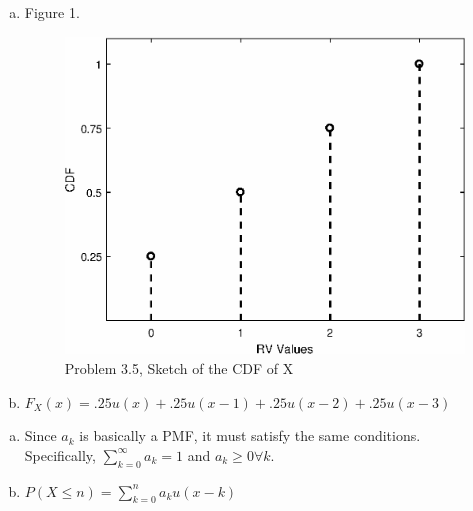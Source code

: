 \documentclass[12pt]{article}
\newenvironment{problem}[2][Problem]{\begin{trivlist}
\item[\hskip \labelsep {\bfseries #1}\hskip \labelsep {\bfseries #2.}]
  \vspace{1 cm}
}{\end{trivlist}}
\begin{document}
\begin{problem}{3.5}
\item
  \begin{enumerate}[a.] 
    \item Figure 1.
     \begin{figure}[htpb]
       \centering
       \includegraphics[width=\textwidth,height=\textheight,keepaspectratio]{fig_3_5.eps}
       \caption{Problem 3.5, Sketch of the CDF of X}
     \end{figure}
    \item %
      $F_X(x) = .25u(x) + .25u(x-1) + .25u(x-2) +.25u(x-3)$
  \end{enumerate}
\end{problem}

\begin{problem}{3.7}
\item
  \begin{enumerate}[a.]
    \item %
      Since $a_k$ is basically a PMF, it must satisfy the same conditions. \\
      Specifically, $\sum_{k=0}^\infty a_k = 1$ and $a_k \geq 0 \forall k$.
    \item %
      $P(X \leq n) = \sum_{k=0}^n a_k u(x-k)$
  \end{enumerate}
\end{problem}
\end{document}

